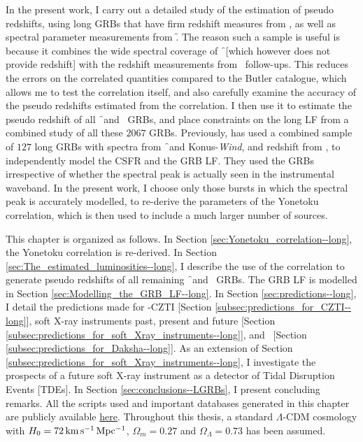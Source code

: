 In the present work, I carry out a detailed study of the estimation of pseudo redshifts, using long GRBs that have firm redshift measures from \s, as well as spectral parameter measurements from \f. The reason such a sample is useful is because it combines the wide spectral coverage of \f\ [which however does not provide redshift] with the redshift measurements from \s\ follow-ups. This reduces the errors on the correlated quantities compared to the Butler catalogue, which allows me to test the correlation itself, and also carefully examine the accuracy of the pseudo redshifts estimated from the correlation. I then use it to estimate the pseudo redshift  of all \f\ and \s\ GRBs, and place constraints on the long LF from a combined study of all these $2067$ GRBs. Previously, \cite{Yu_et_al.-2015-ApJS} has used a combined sample of $127$ long GRBs with spectra from \f\ and Konus-\emph{Wind}, and redshift from \s, to independently model the CSFR and the GRB LF. They used the GRBs irrespective of whether the spectral peak is actually seen in the instrumental waveband. In the present work, I choose only those bursts in which the spectral peak is accurately modelled, to re-derive the parameters of the Yonetoku correlation, which is then used to include a much larger number of sources.

This chapter is organized as follows. In Section \ref{sec:Yonetoku_correlation--long}, the Yonetoku correlation is re-derived. In Section \ref{sec:The_estimated_luminosities--long}, I describe the use of the correlation to generate pseudo redshifts of all remaining \f\ and \s\ GRBs. The GRB LF is modelled in Section \ref{sec:Modelling_the_GRB_LF--long}. In Section \ref{sec:predictions--long}, I detail the predictions made for \AS -CZTI [Section \ref{subsec:predictions_for_CZTI--long}], soft X-ray instruments past, present and future [Section \ref{subsec:predictions_for_soft_Xray_instruments--long}], and \D\ [Section \ref{subsec:predictions_for_Daksha--long}]. As an extension of Section \ref{subsec:predictions_for_soft_Xray_instruments--long}, I investigate the prospects of a future soft X-ray instrument as a detector of Tidal Disruption Events [TDEs]. In Section \ref{sec:conclusions--LGRBs}, I present concluding remarks. All the scripts used and important databases generated in this chapter are publicly available \href{https://github.com/DebduttaPaul/luminosity_function_of_LGRBs}{here}. Throughout this thesis, a standard $\Lambda$-CDM cosmology with $H_0 = 72 \, \rm{km \, s^{-1} \, Mpc^{-1}}$, $\Omega_m = 0.27$ and $\Omega_{\Lambda} = 0.73$ has been assumed.


